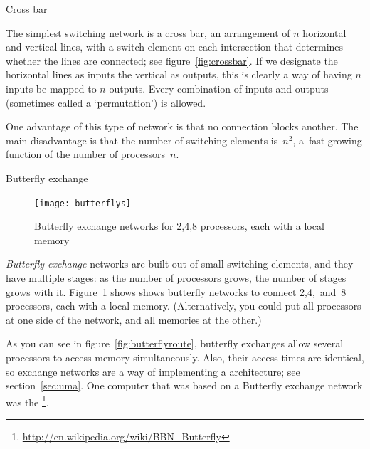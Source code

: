  {Cross bar}

\begin{notlulu}
  \crossbarfig
\end{notlulu}
%
\begin{lulu}
  \crossbarfig
\end{lulu}
%
The simplest switching network is a cross bar, an arrangement of $n$
horizontal and vertical lines, with a switch element on each
intersection that determines whether the lines are connected; see
figure~\ref{fig:crossbar}. If we designate the horizontal lines as
inputs the vertical as outputs, this is clearly a way of having $n$
inputs be mapped to $n$ outputs. Every combination of inputs and
outputs (sometimes called a `permutation') is allowed.

One advantage of this type of network is that no connection 
blocks another.
The main disadvantage  is that the number of 
switching elements is~$n^2$, a~fast growing function of the
number of processors~$n$.

 {Butterfly exchange}

\begin{figure}[ht]
  \texttt{[image: butterflys]}
  \caption{Butterfly exchange networks for 2,4,8 processors, each with
    a local memory}
  \label{fig:butterfly}
\end{figure}

\emph{Butterfly exchange} networks are built out of small switching
elements, and they have multiple stages: as the number of processors
grows, the number of stages grows with it. Figure~\ref{fig:butterfly}
shows shows butterfly networks to connect 2,4,~and~8 processors, each
with a local memory. (Alternatively, you could put all processors at
one side of the network, and all memories at the other.)

As you can see in figure~\ref{fig:butterflyroute}, butterfly exchanges
allow several processors to access memory simultaneously. Also, their
access times are identical, so exchange networks are a way of
implementing a  architecture; see
section~\ref{sec:uma}. One computer that was based on a Butterfly
exchange network was the
\footnote{\url{http://en.wikipedia.org/wiki/BBN_Butterfly}}.

